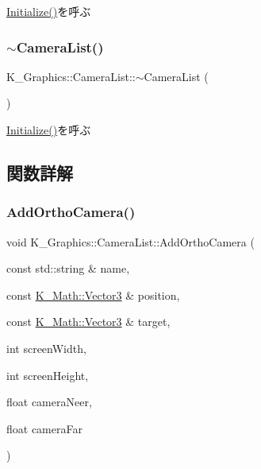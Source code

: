 \mbox{\hyperlink{class_k___graphics_1_1_camera_list_a933c12ada5504b803d7ad91f38a709fc}{Initialize()}}を呼ぶ 

\mbox{\label{class_k___graphics_1_1_camera_list_a6bd62a622ec57ba1bfd3266213024f4b}} 
\subsubsection{\texorpdfstring{$\sim$\+Camera\+List()}{~CameraList()}}
{\footnotesize\ttfamily K\+\_\+\+Graphics\+::\+Camera\+List\+::$\sim$\+Camera\+List (\begin{DoxyParamCaption}{ }\end{DoxyParamCaption})}



\mbox{\hyperlink{class_k___graphics_1_1_camera_list_a933c12ada5504b803d7ad91f38a709fc}{Initialize()}}を呼ぶ 



\subsection{関数詳解}
\mbox{\label{class_k___graphics_1_1_camera_list_ae3e95b8007efa81d1552e05a1b6df63b}} 
\subsubsection{\texorpdfstring{Add\+Ortho\+Camera()}{AddOrthoCamera()}}
{\footnotesize\ttfamily void K\+\_\+\+Graphics\+::\+Camera\+List\+::\+Add\+Ortho\+Camera (\begin{DoxyParamCaption}\item[{const std\+::string \&}]{name,  }\item[{const \mbox{\hyperlink{namespace_k___math_a66884d78082c39ada4091c211f3570f8}{K\+\_\+\+Math\+::\+Vector3}} \&}]{position,  }\item[{const \mbox{\hyperlink{namespace_k___math_a66884d78082c39ada4091c211f3570f8}{K\+\_\+\+Math\+::\+Vector3}} \&}]{target,  }\item[{int}]{screen\+Width,  }\item[{int}]{screen\+Height,  }\item[{float}]{camera\+Neer,  }\item[{float}]{camera\+Far }\end{DoxyParamCaption})}



